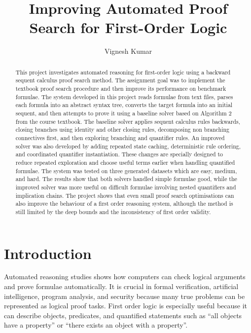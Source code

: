 \documentclass[runningheads]{llncs}
\begin{document}
\title{Improving Automated Proof Search for First-Order Logic}

\author{Vignesh Kumar}

\maketitle

\begin{abstract}
This project investigates automated reasoning for first-order logic using a backward sequent calculus proof search method. The assignment goal was to implement the textbook proof search procedure and then improve its performance on benchmark formulae. The system developed in this project reads formulae from text files, parses each formula into an abstract syntax tree, converts the target formula into an initial sequent, and then attempts to prove it using a baseline solver based on Algorithm 2 from the course textbook. The baseline solver applies sequent calculus rules backwards, closing branches using identity and other closing rules, decomposing non branching connectives first, and then exploring branching and quantifier rules. An improved solver was also developed by adding repeated state caching, deterministic rule ordering, and coordinated quantifier instantiation. These changes are specially designed to reduce repeated exploration and choose useful terms earlier when handling quantified formulae. The system was tested on three generated datasets which are easy, medium, and hard. The results show that both solvers handled simple formulae good, while the improved solver was more useful on difficult formulae involving nested quantifiers and implication chains. The project shows that even small proof search optimisations can also improve the  behaviour of a first order reasoning system, although the method is still limited by the deep bounds and the inconsistency of first order validity.
\end{abstract}

\section{Introduction}

Automated reasoning studies shows how computers can check logical arguments and prove formulae automatically. It is crucial in formal verification, artificial intelligence, program analysis, and security because many true problems can be represented as logical proof tasks. First order logic is especially useful because it can describe objects, predicates, and quantified statements such as ``all objects have a property'' or ``there exists an object with a property''.
\end{document}
